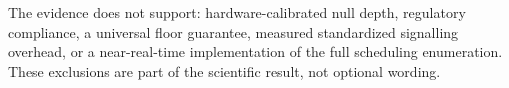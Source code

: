 \documentclass[journal]{IEEEtran}
\begin{document}
The evidence does not support: hardware-calibrated null depth, regulatory compliance, a universal floor guarantee, measured standardized signalling overhead, or a near-real-time implementation of the full scheduling enumeration. These exclusions are part of the scientific result, not optional wording.


\end{document}
